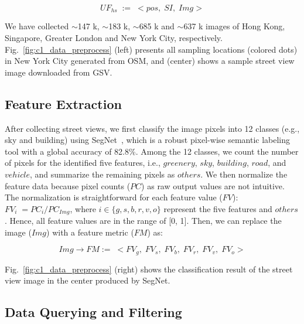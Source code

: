 \vspace*{-5mm}
\begin{equation}
\label{c1_eq_sv}
UF_{hs} \; := \; <pos, \; SI, \; Img>
\end{equation}

We have collected $\sim$147 k, $\sim$183 k, $\sim$685 k and $\sim$637 k images of Hong Kong, Singapore, Greater London and New York City, respectively.
Fig.~\ref{fig:c1_data_preprocess} (left) presents all sampling locations (colored dots) in New York City generated from OSM, and (center) shows a sample street view image downloaded from GSV.

\subsection{Feature Extraction}
\label{ssec:c1_feature}
After collecting street views, we first classify the image pixels into 12 classes (e.g., sky and building) using SegNet~\cite{Badrinarayanan_2015_segnet}, which is a robust pixel-wise semantic labeling tool with a global accuracy of 82.8\%.
Among the 12 classes, we count the number of pixels for the identified five features, i.e., $greenery$, $sky$, $building$, $road$, and $vehicle$, and summarize the remaining pixels as $others$.
We then normalize the feature data because pixel counts ($PC$) as raw output values are not intuitive.
The normalization is straightforward for each feature value ($FV$):
$ FV_i \; = {PC_i} / {PC_{Img}} $, where $i \in \{g, s, b, r, v, o\}$ represent the five features and $others$.
Hence, all feature values are in the range of [0, 1].
Then, we can replace the image ($Img$) with a feature metric ($FM$) as:

\vspace*{-5mm}
\begin{equation}
\label{c1_eq_fm}
Img \rightarrow FM := \; <FV_g, \; FV_s, \; FV_b, \; FV_r, \; FV_v, \; FV_o>
\end{equation}

Fig.~\ref{fig:c1_data_preprocess} (right) shows the classification result of the street view image in the center produced by SegNet.

\subsection{Data Querying and Filtering}
\label{ssec:c1_query}

